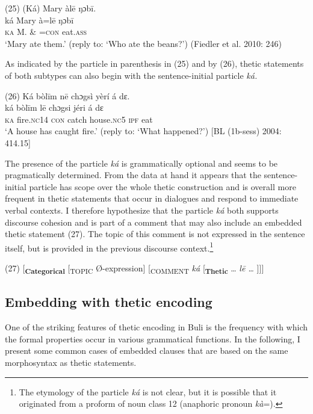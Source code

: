 \documentclass[output=paper]{langsci/langscibook}
\begin{document}
\ea
\glll \textup{(25)}  (Ká)  Mary  àl\={e}    ŋɔb\={i}.\\
  \textup{  ká  Mary  à=l\={e}    ŋɔb\={i}}\\
     \textsc{  }\textsc{ka}  M.  \& =\textsc{con}  eat.\textsc{ass}\\
\glt ‘Mary ate them.’ (reply to: ‘Who ate the beans?’) (Fiedler et al. 2010: 246)
\z

As indicated by the particle in parenthesis in (25) and by (26), thetic statements of both subtypes can also begin with the sentence-initial particle \textit{ká. }

\ea
\glll \textup{(26)}  Ká  bòl\={i}m    n\={e}  chɔgsì  yèrí    á  dɛ.\\
  \textup{  ká  bòl\={i}m    l\={e}  chɔgsi  jéri    á  dɛ}\\
     \textsc{  ka}  fire.\textsc{nc}14  \textsc{con}  catch   house.\textsc{nc}5   \textsc{ipf}   eat\\
\glt ‘A house has caught fire.’ (reply to: ‘What happened?’) [BL (1b-sess) 2004: 414.15]
\z

The presence of the particle \textit{ká }is grammatically optional and seems to be pragmatically determined. From the data at hand it appears that the sentence-initial particle has scope over the whole thetic construction and is overall more frequent in thetic statements that occur in dialogues and respond to immediate verbal contexts. I therefore hypothesize that the particle \textit{ká }both supports discourse cohesion and is part of a comment that may also include an embedded thetic statement (27). The topic of this comment is not expressed in the sentence itself, but is provided in the previous discourse context.\footnote{   The etymology of the particle \textit{ká }is not clear, but it is possible that it originated from a proform of noun class 12 (anaphoric pronoun \textit{kà}=).} 

\ea
{(27)  [\textbf{\textsubscript{Categorical}}\textsubscript{ }[\textsubscript{TOPIC }Ø-expression]\textsubscript{ }[\textsubscript{COMMENT}\textit{ ká} [\textbf{\textsubscript{Thetic}} … \textit{l\={e} … }]]]}
\z

\subsection{Embedding with thetic encoding} %

One of the striking features of thetic encoding in Buli is the frequency with which the formal properties occur in various grammatical functions. In the following, I present some common cases of embedded clauses that are based on the same morphosyntax as thetic statements.
\end{document}
